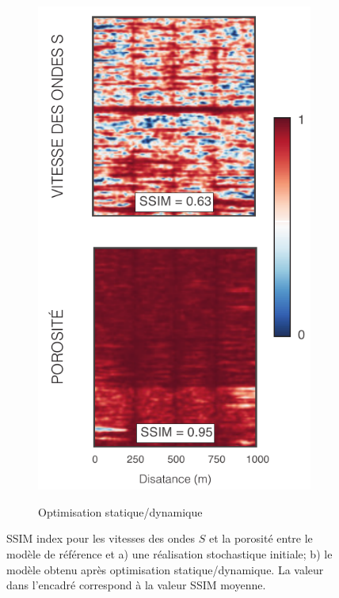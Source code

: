 \begin{figure}[!ht]
\begin{subfigure}[b]{0.35\textwidth}
                \label{fig:SSIM_a}
        \end{subfigure}%
        \begin{subfigure}[b]{0.412\textwidth}
                \caption{Optimisation statique/dynamique}
                \includegraphics[width=\textwidth]{fig/SSIM_2_b.pdf}
                \label{fig:SSIM_b}
        \end{subfigure}
        \caption{SSIM index pour les vitesses des ondes $S$ et la porosité entre
le modèle de référence et a) une réalisation stochastique initiale; b) le modèle
obtenu après optimisation statique/dynamique. La valeur dans l'encadré
correspond à la valeur SSIM moyenne.}
        \label{fig:SSIM_2}
\end{figure}
